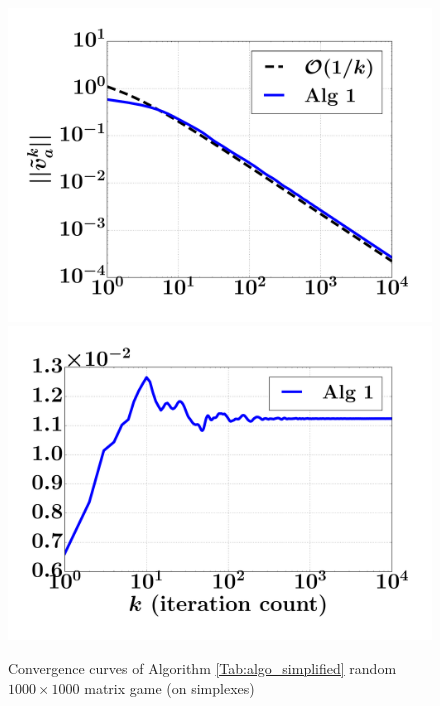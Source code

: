 \documentclass{article} %
\begin{document}
\begin{figure}
  \includegraphics[width=1\linewidth]{simplex_dgap.pdf}
  \includegraphics[width=1\linewidth]{simplex_NE.pdf}
  \caption{Convergence curves of Algorithm \ref{Tab:algo_simplified} random $1000 \times 1000$ matrix game (on simplexes)}
  \label{Tab:sim_dgap_curve}
\end{figure}
\end{document}
